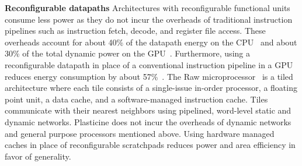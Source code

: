 
%
{\bf Reconfigurable datapaths} Architectures with reconfigurable functional units consume less power
    as they do not incur the overheads of traditional instruction pipelines such as instruction fetch, decode, and register file access.
    These overheads account for about 40\% of the datapath energy on the CPU~\cite{inefficiencies} and about 30\%
    of the total dynamic power on the GPU~\cite{gpuwattch}. Furthermore, using a reconfigurable datapath in place of a
    conventional instruction pipeline in a GPU reduces energy consumption by about 57\%~\cite{sgmf}.
		The Raw microprocessor~\cite{raw} is a tiled architecture where each tile consists of a single-issue in-order processor, a floating point
		unit, a data cache, and a software-managed instruction cache. Tiles communicate with their nearest neighbors using pipelined, word-level static and dynamic
		networks. Plasticine does not incur the overheads of dynamic networks and general purpose processors mentioned above. Using hardware managed caches
		in place of reconfigurable scratchpads reduces power and area efficiency in favor of generality.

